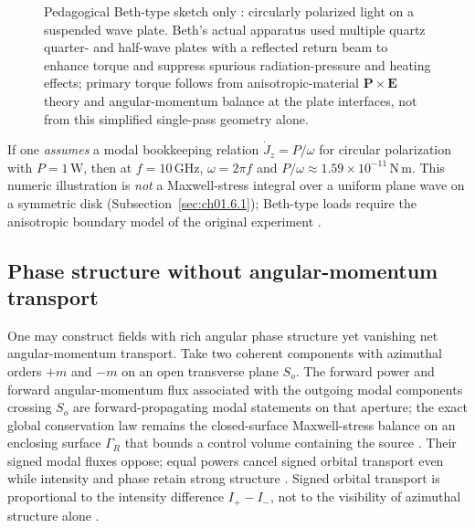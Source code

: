 \begin{figure}[t]
\centering
\VolIPhysFig{\VolIPhysBethSchematic}
\caption{Pedagogical Beth-type sketch only \cite{beth1936}: circularly polarized light on a suspended wave plate. Beth's actual apparatus used multiple quartz quarter- and half-wave plates with a reflected return beam to enhance torque and suppress spurious radiation-pressure and heating effects; primary torque follows from anisotropic-material $\mathbf P\times\mathbf E$ theory and angular-momentum balance at the plate interfaces, not from this simplified single-pass geometry alone.}
\label{fig:ch1.beth-schematic}
\end{figure}

\begin{example}
\label{ex:ch1.beth-torque}
If one \emph{assumes} a modal bookkeeping relation $\dot J_z=P/\omega$ for circular polarization with $P=1\,\mathrm{W}$, then at $f=10\,\mathrm{GHz}$, $\omega=2\pi f$ and $P/\omega\approx1.59\times10^{-11}\,\mathrm{N\,m}$. This numeric illustration is \emph{not} a Maxwell-stress integral over a uniform plane wave on a symmetric disk (Subsection~\ref{sec:ch01.6.1}); Beth-type loads require the anisotropic boundary model of the original experiment \cite{beth1936,stratton1941}.
\end{example}

\subsection{Phase structure without angular-momentum transport}
\label{sec:ch01.6.2}

One may construct fields with rich angular phase structure yet vanishing net angular-momentum transport. Take two coherent components with azimuthal orders \(+m\) and \(-m\) on an open transverse plane \(S_o\). The forward power and forward angular-momentum flux associated with the outgoing modal components crossing \(S_o\) are forward-propagating modal statements on that aperture; the exact global conservation law remains the closed-surface Maxwell-stress balance on an enclosing surface \(\Gamma_R\) that bounds a control volume containing the source \cite{stratton1941,belinfante1940}. Their signed modal fluxes oppose; equal powers cancel signed orbital transport even while intensity and phase retain strong structure \cite{allen1992}. Signed orbital transport is proportional to the intensity difference \(I_+-I_-\), not to the visibility of azimuthal structure alone \cite{stratton1941}.

